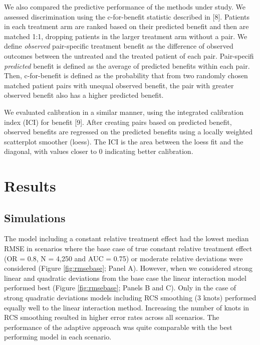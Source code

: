 \documentclass{article}
\begin{document}
We also compared the predictive performance of the methods under study.
We assessed discrimination using the c-for-benefit statistic described
in {[}8{]}. Patients in each treatment arm are ranked based on their
predicted benefit and then are matched 1:1, dropping patients in the
larger treatment arm without a pair. We define \emph{observed}
pair-specific treatment benefit as the difference of observed outcomes
between the untreated and the treated patient of each pair. Pair-specifi
\emph{predicted} benefit is defined as the average of predicted benefits
within each pair. Then, c-for-benefit is defined as the probability that
from two randomly chosen matched patient pairs with unequal observed
benefit, the pair with greater observed benefit also has a higher
predicted benefit.

We evaluated calibration in a similar manner, using the integrated
calibration index (ICI) for benefit {[}9{]}. After creating pairs based
on predicted benefit, observed benefits are regressed on the predicted
benefits using a locally weighted scatterplot smoother (loess). The ICI
is the area between the loess fit and the diagonal, with values closer
to \(0\) indicating better calibration.

\hypertarget{results}{%
\section{Results}\label{results}}

\hypertarget{simulations}{%
\subsection{Simulations}\label{simulations}}

The model including a constant relative treatment effect had the lowest
median RMSE in scenarios where the base case of true constant relative
treatment effect (OR = 0.8, N = 4,250 and AUC = 0.75) or moderate
relative deviations were considered (Figure \ref{fig:rmsebase}; Panel
A). However, when we considered strong linear and quadratic deviations
from the base case the linear interaction model performed best (Figure
\ref{fig:rmsebase}; Panels B and C). Only in the case of strong
quadratic deviations models including RCS smoothing (3 knots) performed
equally well to the linear interaction method. Increasing the number of
knots in RCS smoothing resulted in higher error rates across all
scenarios. The performance of the adaptive approach was quite comparable
with the best performing model in each scenario.
\end{document}
